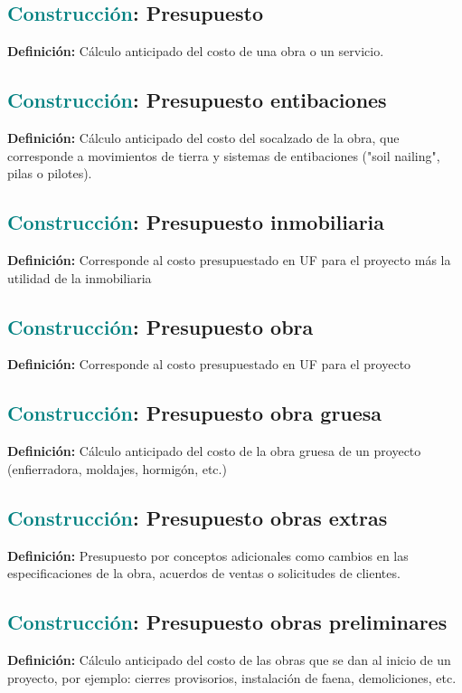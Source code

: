 \documentclass[12pt]{article}
\begin{document}
\subsection{\textcolor{teal}{Construcción}: Presupuesto}
\textbf{Definición:} Cálculo anticipado del costo de una obra o un servicio.
\subsection{\textcolor{teal}{Construcción}: Presupuesto entibaciones}
\textbf{Definición:} Cálculo anticipado del costo del socalzado de la obra, que corresponde a movimientos de tierra y sistemas de entibaciones ("soil nailing", pilas o pilotes).
\subsection{\textcolor{teal}{Construcción}: Presupuesto inmobiliaria}
\textbf{Definición:} Corresponde al costo presupuestado en UF para el proyecto más la utilidad de la inmobiliaria
\subsection{\textcolor{teal}{Construcción}: Presupuesto obra}
\textbf{Definición:} Corresponde al costo presupuestado en UF para el proyecto
\subsection{\textcolor{teal}{Construcción}: Presupuesto obra gruesa}
\textbf{Definición:} Cálculo anticipado del costo de la obra gruesa de un proyecto (enfierradora, moldajes, hormigón, etc.)
\subsection{\textcolor{teal}{Construcción}: Presupuesto obras extras}
\textbf{Definición:} Presupuesto por conceptos adicionales como cambios en las especificaciones de la obra, acuerdos de ventas o solicitudes de clientes.
\subsection{\textcolor{teal}{Construcción}: Presupuesto obras preliminares}
\textbf{Definición:} Cálculo anticipado del costo de las obras que se dan al inicio de un proyecto, por ejemplo: cierres provisorios, instalación de faena, demoliciones, etc.
\end{document}
